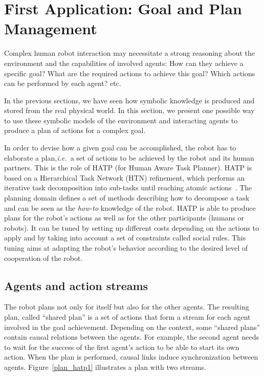 \documentclass{svmult}
\newcommand{\ie}{{\textit{i.e.~}}}
\begin{document}

\section{First Application: Goal and Plan Management}
\label{sec|hatp}

Complex human robot interaction may necessitate a strong reasoning about
the environment and the capabilities of involved agents: How can they
achieve a specific goal? What are the required actions to achieve this
goal? Which actions can be performed by each agent? etc.

In the previous sections, we have seen how symbolic knowledge is produced
and stored from the real physical world. In this section, we present one
possible way to use these symbolic models of the environment and
interacting agents to produce a plan of actions for a complex
goal.

In order to devise how a given goal can be accomplished, the robot has
to elaborate a plan,\ie a set of actions to be achieved by
the robot and its human partners.  This is the role of HATP
\cite{Alili2008} (for Human Aware Task Planner).  HATP is based on a
Hierarchical Task Network (HTN) refinement, which performs an iterative
task decomposition into sub-tasks until reaching atomic
actions~\cite{Nau2003}.  The planning domain defines a set of methods
describing how to decompose a task and can be seen as the {\it how-to}
knowledge of the robot.  HATP is able to produce plans for the robot's
actions as well as for the other participants (humans or robots). It
can be tuned by setting up different costs depending on the actions to
apply and by taking into account a set of constraints called social
rules. This tuning aims at adapting the robot's behavior according to
the desired level of cooperation of the robot.

\subsection*{Agents and action streams}

The robot plans not only for itself but also for the other agents. The
resulting plan, called ``shared plan'' is a set of actions that form
a stream for each agent involved in the goal achievement. Depending on
the context, some ``shared plans'' contain causal relations between the
agents. For example, the second agent needs to wait for the success of
the first agent's action to be able to start its own action. When the
plan is performed, causal links induce synchronization between
agents. Figure~\ref{plan_hatp1} illustrates a plan with two streams.
\end{document}
